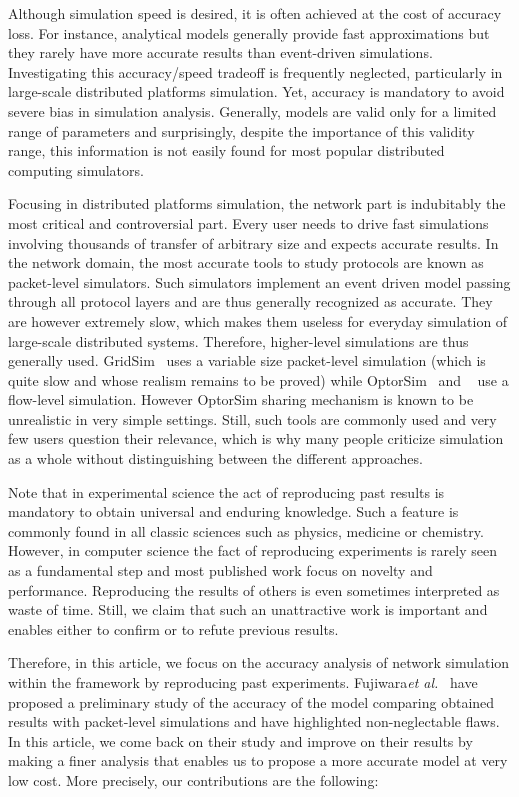 \documentclass{sig-alternate}
\def\etal{\emph{et al.}\xspace}
\begin{document}
Although simulation speed is desired, it is often achieved at the cost
of accuracy loss. For instance, analytical models
generally provide fast approximations but they rarely have more
accurate results than event-driven simulations. Investigating this
accuracy/speed tradeoff is frequently neglected, particularly in
large-scale distributed platforms simulation. Yet, accuracy is mandatory to avoid severe bias in simulation analysis. Generally,
models are valid only for a limited range of parameters and surprisingly,
despite the importance of this validity range, this information is not
easily found for most popular distributed computing simulators.

Focusing in distributed platforms simulation, the
network part is indubitably the most critical and controversial part.
Every user needs to drive fast simulations involving thousands of
transfer of arbitrary size and expects accurate results.  In the
network domain, the most accurate tools to study protocols are known
as packet-level simulators. Such simulators implement an event
driven model passing through all protocol layers and are thus
generally recognized as accurate. They are however extremely slow, which
makes them useless for everyday simulation of large-scale distributed
systems. Therefore, higher-level simulations are thus generally
used. GridSim~\cite{REF_35} uses a variable size packet-level
simulation (which is quite slow and whose realism remains to be
proved) while OptorSim~\cite{REF_2} and \simgrid~\cite{simgrid} use a
flow-level simulation. However OptorSim sharing mechanism is known to
be unrealistic in very simple settings. Still, such tools are commonly
used and very few users question their relevance, which is why many
people criticize simulation as a whole without distinguishing between
the different approaches.

Note that in experimental science the act of reproducing past
results is mandatory to obtain universal and enduring knowledge.
Such a feature is commonly found in all classic
sciences such as physics, medicine or chemistry. However, in computer science
the fact of reproducing experiments is rarely seen as a fundamental
step and most published work focus on novelty and performance.
Reproducing the results of others is even sometimes
interpreted as waste of time. Still, we claim that such an
unattractive work is important and enables either to confirm or to
refute previous results.

Therefore, in this article, we focus on the accuracy analysis of network
simulation within the \simgrid framework by reproducing past experiments.
Fujiwara\etal~\cite{nstools07} have proposed a preliminary
study of the accuracy of the \simgrid model comparing obtained results
with packet-level simulations and have highlighted non-neglectable
flaws. In this article, we come back on their study and improve on
their results by making a finer analysis that enables us to propose a
more accurate model at very low cost. More precisely, our contributions
are the following:
\end{document}
